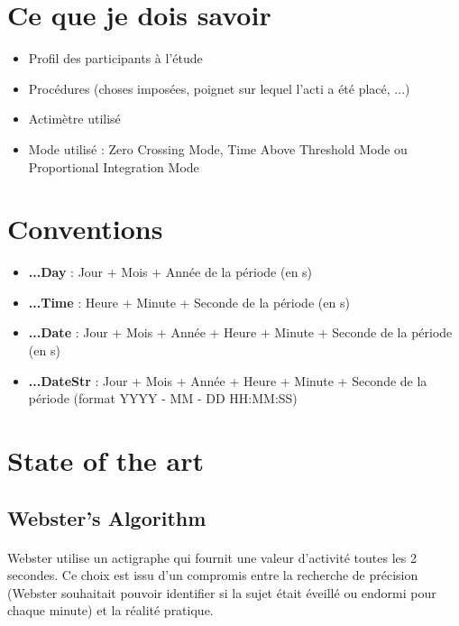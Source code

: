 \documentclass[a4paper,10pt]{article}
\begin{document}
 
 
 \tableofcontents
 \newpage

\section{Ce que je dois savoir}

\begin{itemize}
\item Profil des participants à l'étude
\item Procédures (choses imposées, poignet sur lequel l'acti a été placé, ...)
\item Actimètre utilisé
\item Mode utilisé : Zero Crossing Mode, Time Above Threshold Mode ou Proportional Integration Mode
\end{itemize}

\section{Conventions}

\begin{itemize}
\item \textbf{...Day} : Jour + Mois + Année de la période (en s)
\item \textbf{...Time} : Heure + Minute + Seconde de la période (en s)
\item \textbf{...Date} : Jour + Mois + Année + Heure + Minute + Seconde de la période (en s)
\item \textbf{...DateStr} : Jour + Mois + Année + Heure + Minute + Seconde de la période (format YYYY - MM - DD HH:MM:SS)
\end{itemize}

\section{State of the art}

\subsection{Webster's Algorithm}

\paragraph{}
Webster\cite{Webster1982} utilise un actigraphe qui fournit une valeur d'activité toutes les 2 secondes. Ce choix est issu d'un compromis entre la recherche de précision (Webster souhaitait pouvoir identifier si la sujet était éveillé ou endormi pour chaque minute) et la réalité pratique.
\end{document}
